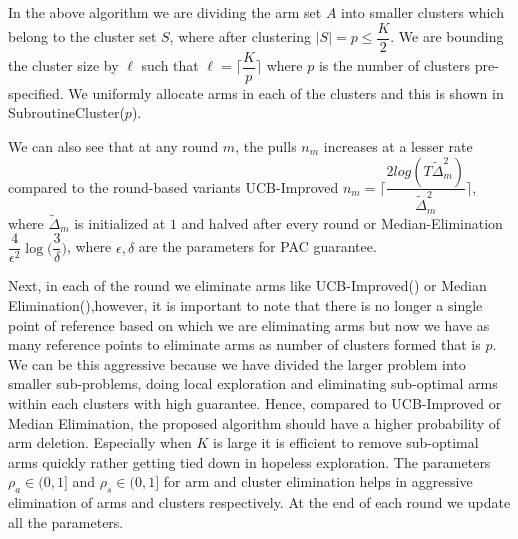 In the above algorithm we are dividing the arm set $A$ into smaller clusters which belong to the cluster set $S$, where after clustering $|S|=p\leq \dfrac{K}{2}$. We are bounding the cluster size by $\ell$ such that $\ell=\bigg\lceil \dfrac{K}{p} \bigg\rceil$ where $p$ is the number of clusters pre-specified. We uniformly allocate arms in each of the clusters and this is shown in SubroutineCluster($p$).

We can also see that at any round $m$, the pulls $n_{m}$ increases at a lesser rate compared to the round-based variants UCB-Improved $n_{m}=\bigg\lceil \dfrac{2log(T\tilde{\Delta}_{m}^{2})}{\tilde{\Delta}_{m}^{2}} \bigg\rceil$, where $\tilde{\Delta}_{m}$ is initialized at $1$ and halved after every round or Median-Elimination $\dfrac{4}{\epsilon^{2}}\log\big(\dfrac{3}{\delta}\big)$, where $\epsilon,\delta$ are the parameters for PAC guarantee.

	Next, in each of the round we eliminate arms like UCB-Improved(\cite{auer2010ucb}) or Median Elimination(\cite{even2006action}),however, it is important to note that there is no longer a single point of reference based on which we are eliminating arms but now we have as many reference points to eliminate arms as number of clusters formed that is $p$. We can be this aggressive because we have divided the larger problem into smaller sub-problems, doing local exploration and eliminating sub-optimal arms within each clusters with high guarantee. Hence, compared to UCB-Improved or Median Elimination, the proposed algorithm should have a higher probability of arm deletion. Especially when $K$ is large it is efficient to remove sub-optimal arms quickly rather getting tied down in hopeless exploration. The parameters $\rho_{a}\in (0,1]$ and $\rho_{s}\in (0,1]$ for arm and cluster elimination helps in aggressive elimination of arms and clusters respectively. At the end of each round we update all the  parameters.

